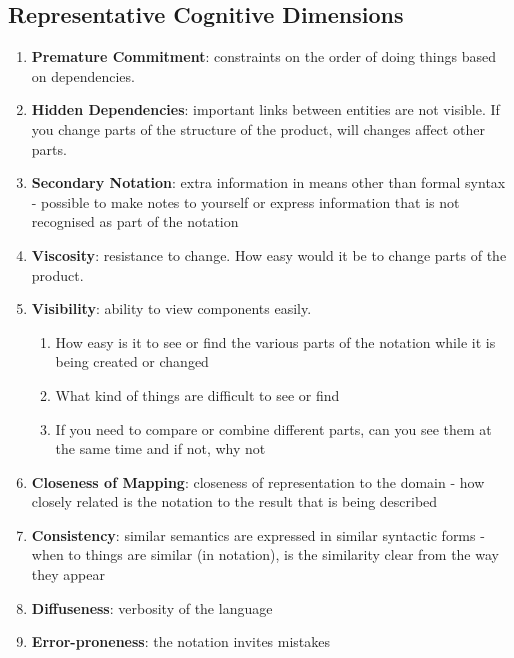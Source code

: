 \documentclass{article}
\begin{document}
\subsection{Representative Cognitive Dimensions}
\begin{enumerate}
    \item \textbf{Premature Commitment}: constraints on the order of doing things based on dependencies.
    
    \item \textbf{Hidden Dependencies}: important links between entities are not visible. If you change parts of the structure of the product, will changes affect other parts.
    
    \item \textbf{Secondary Notation}: extra information in means other than formal syntax - possible to make notes to yourself or express information that is not recognised as part of the notation
    
    \item \textbf{Viscosity}: resistance to change. How easy would it be to change parts of the product.
    
    \item \textbf{Visibility}: ability to view components easily. 
    \begin{enumerate}
        \item How easy is it to see or find the various parts of the notation while it is being created or changed
        \item What kind of things are difficult to see or find
        \item If you need to compare or combine different parts, can you see them at the same time and if not, why not
    \end{enumerate}
    
    \item \textbf{Closeness of Mapping}: closeness of representation to the domain - how closely related is the notation to the result that is being described
    
    \item \textbf{Consistency}: similar semantics are expressed in similar syntactic forms - when to things are similar (in notation), is the similarity clear from the way they appear
    
    \item \textbf{Diffuseness}: verbosity of the language
    
    \item \textbf{Error-proneness}: the notation invites mistakes
    

\end{enumerate}
\end{document}
